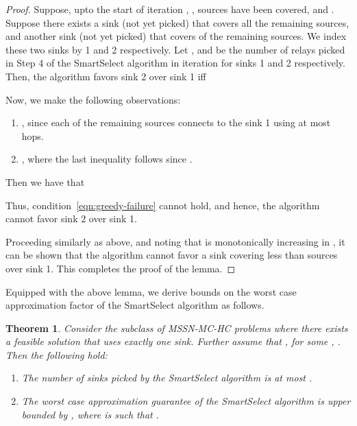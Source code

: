 \documentclass[conference]{IEEEtran}
\newtheorem{theorem}{Theorem}
\begin{document}
\begin{proof}
Suppose, upto the start of iteration , ,  sources have been covered, and . Suppose there exists a sink (not yet picked) that covers all the remaining sources, and another sink (not yet picked) that covers  of the remaining sources. We index these two sinks by 1 and 2 respectively. Let , and  be the number of relays picked in Step 4 of the SmartSelect algorithm in iteration  for sinks 1 and 2 respectively. Then, the algorithm favors sink 2 over sink 1 iff

Now, we make the following observations:
\begin{enumerate}
\item , since each of the remaining sources connects to the sink 1 using at most  hops.
\item , where the last inequality follows since . 
\end{enumerate} 

Then we have that



Thus, condition~\eqref{eqn:greedy-failure} cannot hold, and hence, the algorithm cannot favor sink 2 over sink 1.

Proceeding similarly as above, and noting that  is monotonically increasing in , it can be shown that the algorithm cannot favor a sink covering less than  sources over sink 1. This completes the proof of the lemma.
\end{proof}

Equipped with the above lemma, we derive bounds on the worst case approximation factor of the SmartSelect algorithm as follows.

\begin{theorem}
\label{thm:smartselect-approx_special}
Consider the subclass of MSSN-MC-HC problems where there exists a feasible solution that uses exactly one sink. Further assume that , for some , . Then the following hold:
\begin{enumerate}
\item The number of sinks picked by the SmartSelect algorithm is at most .
\item The worst case approximation guarantee of the SmartSelect algorithm is upper bounded by , where  is such that .
\end{enumerate} 
\end{theorem}
\end{document}
